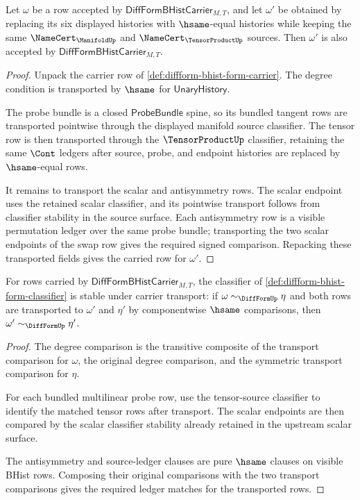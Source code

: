 \begin{theorem}
\label{thm:diffform-carrier-hsame-transport}
Let $\omega$ be a row accepted by
$\mathsf{DiffFormBHistCarrier}_{M,T}$, and let $\omega'$ be obtained by
replacing its six displayed histories with $\hsame$-equal histories while
keeping the same $\NameCert_{\ManifoldUp}$ and $\NameCert_{\TensorProductUp}$
sources. Then $\omega'$ is also accepted by
$\mathsf{DiffFormBHistCarrier}_{M,T}$.
\end{theorem}
\begin{proof}
Unpack the carrier row of \autoref{def:diffform-bhist-form-carrier}. The
degree condition is transported by $\hsame$ for $\mathsf{UnaryHistory}$.

The probe bundle is a closed $\mathsf{ProbeBundle}$ spine, so its bundled
tangent rows are transported pointwise through the displayed manifold source
classifier. The tensor row is then transported through the
$\TensorProductUp$ classifier, retaining the same $\Cont$ ledgers after
source, probe, and endpoint histories are replaced by $\hsame$-equal rows.

It remains to transport the scalar and antisymmetry rows. The scalar endpoint
uses the retained scalar classifier, and its pointwise transport follows from
classifier stability in the source surface. Each antisymmetry row is a visible
permutation ledger over the same probe bundle; transporting the two scalar
endpoints of the swap row gives the required signed comparison. Repacking
these transported fields gives the carried row for $\omega'$.
\end{proof}

\begin{theorem}
\label{thm:diffform-form-classifier-stability}
For rows carried by $\mathsf{DiffFormBHistCarrier}_{M,T}$, the classifier of
\autoref{def:diffform-bhist-form-classifier} is stable under carrier
transport: if $\omega\sim_{\DiffFormUp}\eta$ and both rows are transported to
$\omega'$ and $\eta'$ by componentwise $\hsame$ comparisons, then
$\omega'\sim_{\DiffFormUp}\eta'$.
\end{theorem}
\begin{proof}
The degree comparison is the transitive composite of the transport comparison
for $\omega$, the original degree comparison, and the symmetric transport
comparison for $\eta$.

For each bundled multilinear probe row, use the tensor-source classifier to
identify the matched tensor rows after transport. The scalar endpoints are
then compared by the scalar classifier stability already retained in the
upstream scalar surface.

The antisymmetry and source-ledger clauses are pure $\hsame$ clauses on
visible BHist rows. Composing their original comparisons with the two
transport comparisons gives the required ledger matches for the transported
rows.
\end{proof}
